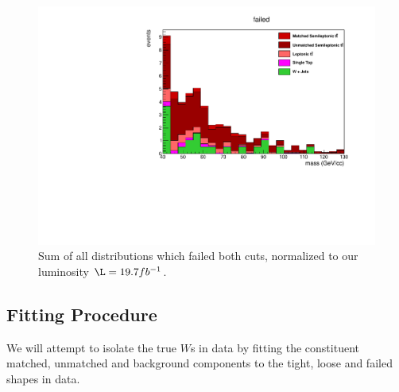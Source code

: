 \begin{figure}[h!]
\centering
\includegraphics[scale=0.66]{EXO-12-024/figs/WtagSF/TOTAL_FAIL.pdf}
\caption{Sum of all distributions which failed both cuts, normalized to our luminosity $\L = 19.7 fb^{-1}$. }\label{fig:failedHIST}
\end{figure}
\subsection{Fitting Procedure}
We will attempt to isolate the true $W$s in data by fitting the constituent matched, unmatched and background components to the tight, loose and failed shapes in data.

